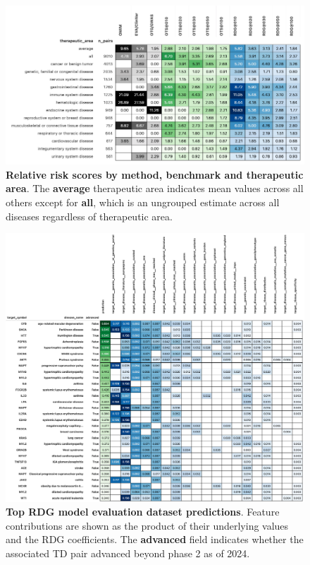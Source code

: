 \documentclass{article}
\begin{document}
\begin{figure}
  \centering
  \captionsetup{width=.9\linewidth}
  \includegraphics[width=1\textwidth]{relative_risk_by_ta.png}
  \caption{
    \textbf{Relative risk scores by method, benchmark and therapeutic area}.
    The \textbf{average} therapeutic area indicates mean values across all others except for \textbf{all}, which is an ungrouped estimate across all diseases regardless of therapeutic area.
  }
  \label{fig:relative_risk_by_ta}
\end{figure}


\begin{figure}
  \centering
  \captionsetup{width=.9\linewidth}
  \includegraphics[width=1\textwidth]{top_evaluation_predictions.png}
  \caption{
    \textbf{Top RDG model evaluation dataset predictions}.
    Feature contributions are shown as the product of their underlying values and the RDG coefficients. The \textbf{advanced} field indicates whether the associated TD pair advanced beyond phase 2 as of 2024.
  }
  \label{fig:top_evaluation_predictions}
\end{figure}
\end{document}
